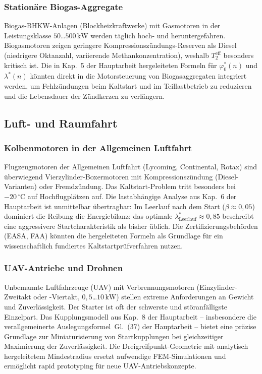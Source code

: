﻿\documentclass[a4paper,12pt]{article}
\begin{document}
\subsubsection{Stationäre Biogas-Aggregate}

Biogas-BHKW-Anlagen (Blockheizkraftwerke) mit Gasmotoren
in der Leistungsklasse $50$\ldots$500\,\text{kW}$ werden täglich
hoch- und heruntergefahren. Biogasmotoren zeigen geringere
Kompressionszündungs-Reserven als Diesel (niedrigere Oktanzahl,
variierende Methankonzentration), weshalb $T_2^\text{eff}$
besonders kritisch ist. Die in Kap.~5 der Hauptarbeit
hergeleiteten Formeln für $\varphi_0^*(n)$ und $\lambda^*(n)$
könnten direkt in die Motorsteuerung von Biogasaggregaten
integriert werden, um Fehlzündungen beim Kaltstart und im
Teillastbetrieb zu reduzieren und die Lebensdauer der
Zündkerzen zu verlängern.

\subsection{Luft- und Raumfahrt}

\subsubsection{Kolbenmotoren in der Allgemeinen Luftfahrt}

Flugzeugmotoren der Allgemeinen Luftfahrt (Lycoming, Continental,
Rotax) sind überwiegend Vierzylinder-Boxermotoren mit
Kompressionszündung (Diesel-Varianten) oder Fremdzündung.
Das Kaltstart-Problem tritt besonders bei
$-20\,^\circ\text{C}$ auf Hochflugplätzen auf. Die
lastabhängige Analyse aus Kap.~6 der Hauptarbeit ist
unmittelbar übertragbar: Im Leerlauf nach dem Start
($\beta \approx 0{,}05$) dominiert die Reibung die
Energiebilanz; das optimale $\lambda^*_\text{Leerlauf} \approx 0{,}85$
beschreibt eine aggressivere Startcharakteristik als bisher üblich.
Die Zertifizierungsbehörden (EASA, FAA) könnten die
hergeleiteten Formeln als Grundlage für ein
wissenschaftlich fundiertes Kaltstartprüfverfahren nutzen.

\subsubsection{UAV-Antriebe und Drohnen}

Unbemannte Luftfahrzeuge (UAV) mit Verbrennungsmotoren
(Einzylinder-Zweitakt oder -Viertakt, $0{,}5$\ldots$10\,\text{kW}$)
stellen extreme Anforderungen an Gewicht und Zuverlässigkeit.
Der Starter ist oft der schwerste und störanfälligste Einzelpart.
Das Kupplungsmodell aus Kap.~8 der Hauptarbeit --
insbesondere die verallgemeinerte Auslegungsformel~Gl.~(37) der Hauptarbeit --
bietet eine präzise Grundlage zur Miniaturisierung von
Startkupplungen bei gleichzeitiger Maximierung der Zuverlässigkeit.
Die Dreigreifpunkt-Geometrie mit analytisch hergeleitetem
Mindestradius ersetzt aufwendige FEM-Simulationen und
ermöglicht rapid prototyping für neue UAV-Antriebskonzepte.
\end{document}
